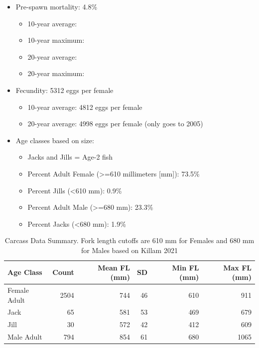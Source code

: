 \documentclass[
]{book}
\providecommand{\tightlist}{%
  \setlength{\itemsep}{0pt}\setlength{\parskip}{0pt}}
\theoremstyle{definition}
\theoremstyle{definition}
\theoremstyle{definition}
\theoremstyle{definition}
\theoremstyle{remark}
\begin{document}
\begin{itemize}
\tightlist
\item
  Pre-spawn mortality: 4.8\%

  \begin{itemize}
  \tightlist
  \item
    10-year average:
  \item
    10-year maximum:
  \item
    20-year average:
  \item
    20-year maximum:
  \end{itemize}
\item
  Fecundity: 5312 eggs per female

  \begin{itemize}
  \tightlist
  \item
    10-year average: 4812 eggs per female
  \item
    20-year average: 4998 eggs per female (only goes to 2005)
  \end{itemize}
\item
  Age classes based on size:

  \begin{itemize}
  \tightlist
  \item
    Jacks and Jills = Age-2 fish
  \item
    Percent Adult Female (\textgreater=610 millimeters {[}mm{]}): 73.5\%
  \item
    Percent Jills (\textless610 mm): 0.9\%
  \item
    Percent Adult Male (\textgreater=680 mm): 23.3\%
  \item
    Percent Jacks (\textless680 mm): 1.9\%
  \end{itemize}
\end{itemize}

\begin{table}
\centering
\caption{Carcass Data Summary. Fork length cutoffs are 610 mm for Females and 680 mm for Males based on Killam 2021}
\centering
\begin{tabular}[t]{lrrrrr}
\hline
Age Class & Count & Mean FL (mm) & SD & Min FL (mm) & Max FL (mm)\\
\hline
Female Adult & 2504 & 744 & 46 & 610 & 911\\
\hline
Jack & 65 & 581 & 53 & 469 & 679\\
\hline
Jill & 30 & 572 & 42 & 412 & 609\\
\hline
Male Adult & 794 & 854 & 61 & 680 & 1065\\
\hline
\end{tabular}
\end{table}
\end{document}

